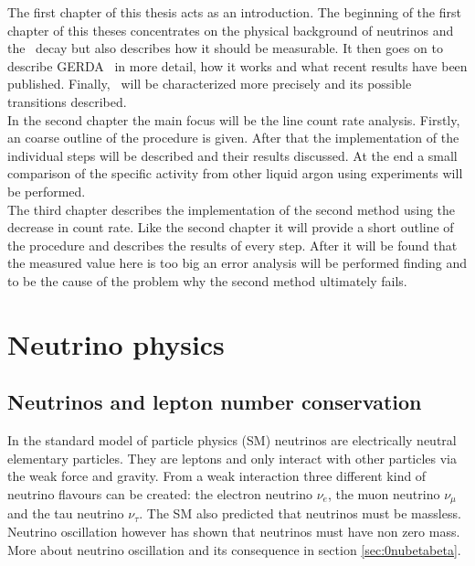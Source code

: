 \documentclass[encoding=utf8,british]{tumphthesis}
\begin{document}
The first chapter of this thesis acts as an introduction.
The beginning of the first chapter of this theses concentrates on the physical background of neutrinos and the \onbb\ decay but also describes how it should be measurable. 
It then goes on to describe GERDA \PII\ in more detail, how it works and what recent results have been published.
Finally, \Kr\ will be characterized more precisely and its possible transitions described. 
\\

In the second chapter the main focus will be the line count rate analysis.
Firstly, an coarse outline of the procedure is given.
After that the implementation of the individual steps will be described and their results discussed.
At the end a small comparison of the specific activity from other liquid argon using experiments will be performed.
\\

The third chapter describes the implementation of the second method using the decrease in count rate.
Like the second chapter it will provide a short outline of the procedure and describes the results of every step.
After it will be found that the measured value here is too big an error analysis will be performed finding  and  to be the cause of the problem why the second method ultimately fails.
\\


\section{Neutrino physics}
\label{sec:PhyBG}

\subsection{Neutrinos and lepton number conservation}

In the standard model of particle physics (SM) neutrinos are electrically neutral elementary particles.
They are leptons and only interact with other particles via the weak force and gravity.
From a weak interaction three different kind of neutrino flavours can be created: the electron neutrino $\nu_e$, the muon neutrino $\nu_{\mu}$ and the tau neutrino $\nu_{\tau}$.
The SM also predicted that neutrinos must be massless.
Neutrino oscillation however has shown that neutrinos must have non zero mass.
More about neutrino oscillation and its consequence in section \ref{sec:0nubetabeta}.
\\
\end{document}
